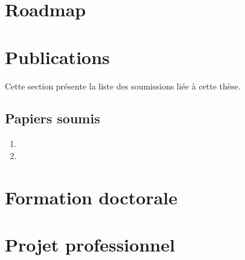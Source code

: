 \documentclass[a4paper]{article}
\begin{document}
\section{Roadmap}
\label{sec:roadmap}

\section{Publications}

Cette section présente la liste des  soumissions liée à cette thèse.


\subsection{Papiers soumis}

\begin{enumerate}
  \item 
  \item 
\end{enumerate}

\section{Formation doctorale}


\section{Projet professionnel}



\footnotesize{
 

}
\end{document}
